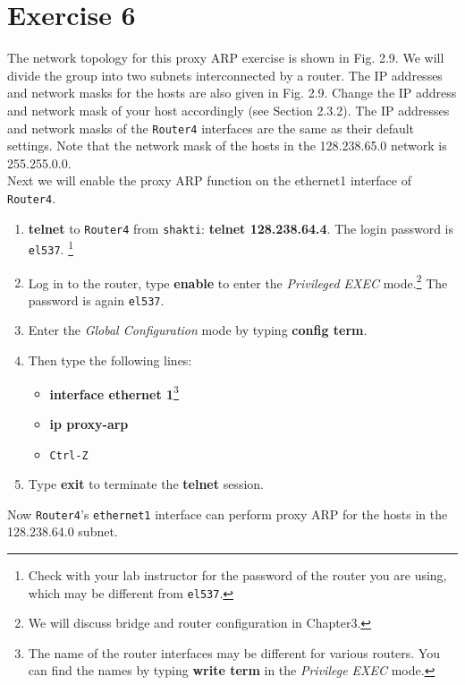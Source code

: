 \documentclass[10pt,a4paper]{article}
\numberwithin{equation}{section}
\numberwithin{figure}{section}
\numberwithin{table}{section}
\begin{document}
    \section{ Exercise 6}
    The network topology for this proxy ARP exercise is shown in Fig. 2.9. We will divide the group into two subnets interconnected by a router. The IP addresses and network masks for the hosts are also given in Fig. 2.9. Change the IP address and network mask of your host accordingly (see Section 2.3.2). The IP addresses and network masks of the \texttt{Router4} interfaces are the same as their default settings.
    Note that the network mask of the hosts in the 128.238.65.0 network is 255.255.0.0. \\
    Next we will enable the proxy ARP function on the ethernet1 interface of \texttt{Router4}. \\
    \begin{enumerate}
        \item \textbf{telnet} to \texttt{Router4} from \texttt{shakti}: \textbf{telnet 128.238.64.4}.
        The login password is \texttt{el537}. \footnote{Check with your lab instructor for the password of the router you are using, which may be different from \texttt{el537}.}
        \item Log in to the router, type \textbf{enable} to enter the \textit{Privileged EXEC} mode.\footnote{We will discuss bridge and router configuration in Chapter3.} The password is again \texttt{el537}.
        \item Enter the \textit{Global Configuration} mode by typing \textbf{config term}.
        \item Then type the following lines:
        \begin{itemize}
            \item \textbf{interface ethernet 1}\footnote{The name of the router interfaces may be different for various routers.
            You can find the names by typing \textbf{write term} in the \textit{Privilege EXEC} mode.}
            \item \textbf{ip proxy-arp}
            \item \texttt{Ctrl-Z}
        \end{itemize}
        \item Type \textbf{exit} to terminate the \textbf{telnet} session.
    \end{enumerate}
    Now \texttt{Router4}’s \texttt{ethernet1} interface can perform proxy ARP for the hosts in the 128.238.64.0 subnet. \\
\end{document}
